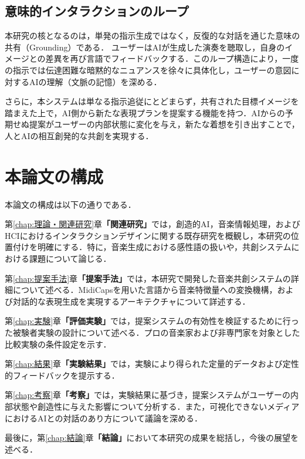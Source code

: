 \subsection{意味的インタラクションのループ}
本研究の核となるのは，単発の指示生成ではなく，反復的な対話を通じた意味の共有（Grounding）である．
ユーザーはAIが生成した演奏を聴取し，自身のイメージとの差異を再び言語でフィードバックする．このループ構造により，一度の指示では伝達困難な暗黙的なニュアンスを徐々に具体化し，ユーザーの意図に対するAIの理解（文脈の記憶）を深める．

さらに，本システムは単なる指示追従にとどまらず，共有された目標イメージを踏まえた上で，AI側から新たな表現プランを提案する機能を持つ．AIからの予期せぬ提案がユーザーの内部状態に変化を与え，新たな着想を引き出すことで，人とAIの相互創発的な共創を実現する．

\section{本論文の構成}
本論文の構成は以下の通りである．

第\ref{chap:理論・関連研究}章\textbf{「関連研究」}では，創造的AI，音楽情報処理，およびHCIにおけるインタラクションデザインに関する既存研究を概観し，本研究の位置付けを明確にする．特に，音楽生成における感性語の扱いや，共創システムにおける課題について論じる．

第\ref{chap:提案手法}章\textbf{「提案手法」}では，本研究で開発した音楽共創システムの詳細について述べる．MidiCapsを用いた言語から音楽特徴量への変換機構，および対話的な表現生成を実現するアーキテクチャについて詳述する．

第\ref{chap:実験}章\textbf{「評価実験」}では，提案システムの有効性を検証するために行った被験者実験の設計について述べる．プロの音楽家および非専門家を対象とした比較実験の条件設定を示す．

第\ref{chap:結果}章\textbf{「実験結果」}では，実験により得られた定量的データおよび定性的フィードバックを提示する．

第\ref{chap:考察}章\textbf{「考察」}では，実験結果に基づき，提案システムがユーザーの内部状態や創造性に与えた影響について分析する．また，可視化できないメディアにおけるAIとの対話のあり方について議論を深める．

最後に，第\ref{chap:結論}章\textbf{「結論」}において本研究の成果を総括し，今後の展望を述べる．